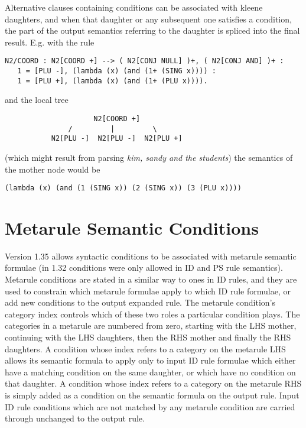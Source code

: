 Alternative clauses containing conditions can be associated with kleene daughters,
and when that daughter or any subsequent one satisfies a condition, the part of
the output semantics referring to the daughter is spliced into the final
result. E.g. with the rule
\begin{ex}
\begin{verbatim}
N2/COORD : N2[COORD +] --> ( N2[CONJ NULL] )+, ( N2[CONJ AND] )+ : 
   1 = [PLU -], (lambda (x) (and (1+ (SING x)))) : 
   1 = [PLU +], (lambda (x) (and (1+ (PLU x)))). 
\end{verbatim}
\end{ex}
and the local tree
\begin{ex}
\begin{verbatim}
                     N2[COORD +]
               /         |         \
           N2[PLU -]  N2[PLU -]  N2[PLU +]
\end{verbatim}
\end{ex}
(which might result from parsing {\it kim, sandy and the students}) the
semantics of the mother node would be
\begin{ex}
\begin{verbatim}
(lambda (x) (and (1 (SING x)) (2 (SING x)) (3 (PLU x))))
\end{verbatim}
\end{ex}


\section*{Metarule Semantic Conditions}

Version 1.35 allows syntactic conditions to be associated with
metarule semantic formulae (in 1.32 conditions were only allowed in ID and PS
rule semantics). Metarule conditions are stated in a similar way to ones in ID
rules, and they are used to constrain which metarule formulae apply to which ID
rule formulae, or add new conditions to the output expanded rule. The metarule
condition's category index controls which of these two roles a particular condition
plays. The categories in a metarule are numbered from zero, starting with the LHS
mother, continuing with the LHS daughters, then the RHS mother and finally
the RHS daughters.
A condition whose index refers to a category on the metarule LHS allows
its semantic formula to apply only to input ID rule formulae which either have a 
matching condition on the same daughter, or which have no condition on that daughter.
A condition whose index refers to a category on the metarule RHS is
simply added as a condition on the semantic formula on the output rule. Input
ID rule conditions which are not matched by any metarule condition are
carried through unchanged to the output rule.

